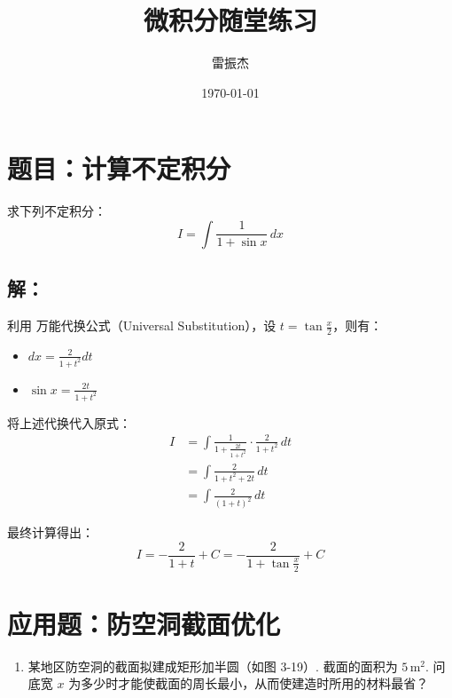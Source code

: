 \documentclass[UTF8]{ctexart}
\title{微积分随堂练习}
\author{雷振杰}
\date{\today}
\begin{document}
\maketitle

\section{题目：计算不定积分}

求下列不定积分：
\begin{equation}
    I = \int \frac{1}{1 + \sin x} \,dx
\end{equation}

\subsection*{解：}利用 万能代换公式（Universal Substitution），设 $t = \tan \frac{x}{2}$，则有：
\begin{itemize}
    \item $dx = \frac{2}{1 + t^2} dt$
    \item $\sin x = \frac{2t}{1 + t^2}$
\end{itemize}

将上述代换代入原式：
\begin{align*}
    I &= \int \frac{1}{1 + \frac{2t}{1+t^2}} \cdot \frac{2}{1+t^2} \,dt \\
      &= \int \frac{2}{1 + t^2 + 2t} \,dt \\
      &= \int \frac{2}{(1 + t)^2} \,dt
\end{align*}

最终计算得出：
\begin{equation}
    I = -\frac{2}{1 + t} + C = -\frac{2}{1 + \tan \frac{x}{2}} + C
\end{equation}

\newpage

\section{应用题：防空洞截面优化}

\begin{enumerate}
    \item[12.] 某地区防空洞的截面拟建成矩形加半圆（如图 3-19）. 截面的面积为 $5 \, \mathrm{m}^2$. 问底宽 $x$ 为多少时才能使截面的周长最小，从而使建造时所用的材料最省？
\end{enumerate}
\end{document}
